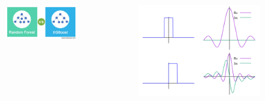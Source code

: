 \begin{frame}
\begin{columns}
	\begin{figure}
		\includegraphics[width=\textwidth]{img/rfr-xgb.jpg}
	\end{figure}	
	
	\begin{figure}
		\includegraphics[width=\textwidth]{img/fourier.png}
	\end{figure}	
\end{columns}

\end{frame}